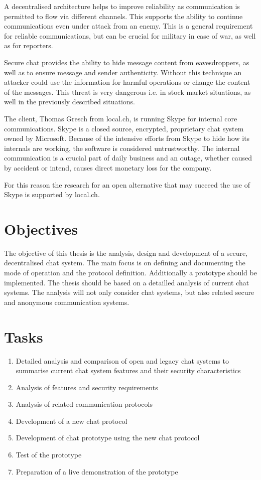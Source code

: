 A decentralised architecture helps to improve reliability as communication is
permitted to flow via different channels. This supports the ability to 
continue communications even under attack from an enemy. This is a general
requirement for reliable communications, but can be crucial for military in
case of war, as well as for reporters.

Secure chat provides the ability to hide message content from eavesdroppers,
as well as to ensure message and sender authenticity.  Without this technique
an attacker could use the information for harmful operations or change the
content of the messages. This threat is very dangerous i.e. in stock market 
situations, as well in the previously described situations.

The client, Thomas Gresch from local.ch, is running Skype for internal core 
communications. Skype is a closed source, encrypted, proprietary chat system 
owned by Microsoft. Because of the intensive efforts from Skype to hide how 
its internals are working, the software is considered untrustworthy.
The internal communication is a crucial part of daily business and an 
outage, whether caused by accident or intend, causes direct monetary 
loss for the company.

For this reason the research for an open alternative that may succeed 
the use of Skype is supported by local.ch.
\section{Objectives}
The objective of this thesis is the analysis, design and development of a secure, decentralised chat system. The main focus is on defining and documenting the mode of operation and the protocol definition. Additionally a prototype should be implemented. The thesis should be based on a detailled analysis of current chat systems. The analysis will not only consider chat systems, but also related secure and anonymous communication systems.
\section{Tasks}
\begin{enumerate}
\item Detailed analysis and comparison of open and legacy chat systems to summarise current chat system features and their security characteristics
\item Analysis of features and security requirements
\item Analysis of related communication protocols
\item Development of a new chat protocol
\item Development of chat prototype using the new chat protocol
\item Test of the prototype
\item Preparation of a live demonstration of the prototype
\end{enumerate}
